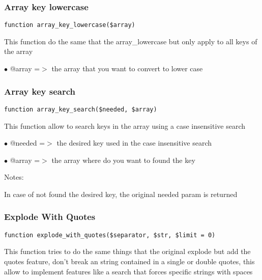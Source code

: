 \documentclass[a4paper]{article}
\begin{document}
\hypertarget{toc70}{}
\subsubsection{Array key lowercase}

\begin{lstlisting}
function array_key_lowercase($array)
\end{lstlisting}

This function do the same that the array\_lowercase but only apply to all
keys of the array

\begin{compactitem}
\item[\color{myblue}$\bullet$] @array =$>$ the array that you want to convert to lower case
\end{compactitem}

\hypertarget{toc71}{}
\subsubsection{Array key search}

\begin{lstlisting}
function array_key_search($needed, $array)
\end{lstlisting}

This function allow to search keys in the array using a case insensitive search

\begin{compactitem}
\item[\color{myblue}$\bullet$] @needed =$>$ the desired key used in the case insensitive search
\item[\color{myblue}$\bullet$] @array  =$>$ the array where do you want to found the key
\end{compactitem}

Notes:

In case of not found the desired key, the original needed param is returned

\hypertarget{toc72}{}
\subsubsection{Explode With Quotes}

\begin{lstlisting}
function explode_with_quotes($separator, $str, $limit = 0)
\end{lstlisting}

This function tries to do the same things that the original explode but add
the quotes feature, don't break an string contained in a single or double
quotes, this allow to implement features like a search that forces specific
strings with spaces
\end{document}
